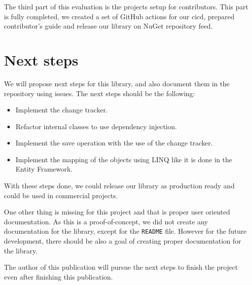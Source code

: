 The third part of this evaluation is the projects setup for contributors.
This part is fully completed, we created a set of GitHub actions for our \acrshort{cicd}, prepared contributor's guide and release our library on NuGet repository feed.


\section{Next steps}

We will propose next steps for this library, and also document them in the repository using issues. The next steps should be the following:
\begin{itemize}
    \item {Implement the change tracker.}
    \item {Refactor internal classes to use dependency injection.}
    \item {Implement the save operation with the use of the change tracker.}
    \item {Implement the mapping of the objects using LINQ like it is done in the Entity Framework.}
\end{itemize}
With these steps done, we could release our library as production ready and could be used in commercial projects.

One other thing is missing for this project and that is proper user oriented documentation.
As this is a proof-of-concept, we did not create any documentation for the library, except for the \texttt{README} file.
However for the future development, there should be also a goal of creating proper documentation for the library.

The author of this publication will pursue the next steps to finish the project even after finishing this publication.